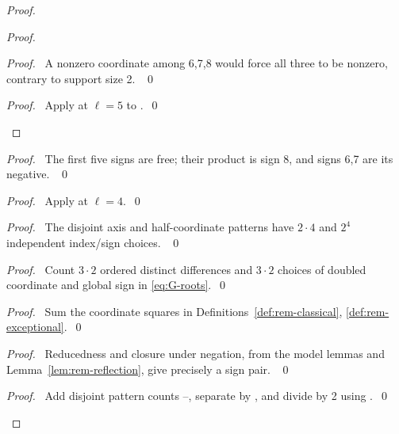 \begin{proof}
\begin{proof}
\begin{proof}\pf\ A nonzero coordinate among 6,7,8 would force all
three to be nonzero, contrary to support size 2. ~\qed\end{proof}
\qedstep
\begin{proof}\pf\ Apply  at $\ell=5$ to
.~\qed\end{proof}
\end{proof}
\begin{proof}\pf\ The first five signs are free; their product is
sign 8, and signs 6,7 are its negative. ~\qed\end{proof}
\begin{proof}\pf\ Apply  at $\ell=4$.~\qed\end{proof}
\begin{proof}\pf\ The disjoint axis and half-coordinate patterns have
$2\cdot4$ and $2^4$ independent index/sign choices. ~\qed\end{proof}
\begin{proof}\pf\ Count $3\cdot2$ ordered distinct differences and
$3\cdot2$ choices of doubled coordinate and global sign in \eqref{eq:G-roots}.~\qed\end{proof}
\begin{proof}\pf\ Sum the coordinate squares in
Definitions~\ref{def:rem-classical}, \ref{def:rem-exceptional}.~\qed\end{proof}
\begin{proof}\pf\ Reducedness and closure under negation, from the
model lemmas and Lemma~\ref{lem:rem-reflection}, give precisely a sign pair. ~\qed\end{proof}
\qedstep
\begin{proof}\pf\ Add disjoint pattern counts
--, separate by ,
and divide by 2 using .~\qed\end{proof}
\end{proof}


